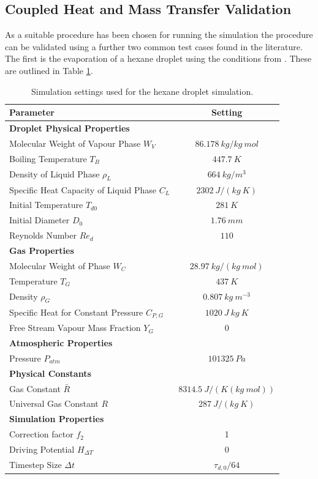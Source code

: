 \documentclass[../Interim_Report_Master]{subfiles}
\begin{document}
\subsection{Coupled Heat and Mass Transfer Validation}\label{sec:heat_mass_val}
As a suitable procedure has been chosen for running the simulation the procedure can be validated using a further two common test cases found in the literature. The first is the evaporation of a hexane droplet using the conditions from \cite{Downing1966}. These are outlined in Table \ref{tab:sim_set_hex}. 
\begin{table}[H]
	\centering
	\begin{tabular}{|l c|}
		\hline
		\textbf{Parameter} & \textbf{Setting} \\ \hline
		\textbf{Droplet Physical Properties} &  \\ 
		Molecular Weight of Vapour Phase $W_V$ & $86.178~kg/kg~mol$ \\ 
		Boiling Temperature $T_B$ & $447.7~K$ \\ 
		Density of Liquid Phase $\rho_L$ & $664~kg/m^3$ \\
		Specific Heat Capacity of Liquid Phase $C_L$ & $2302~J/(kg~K)$ \\ 
		Initial Temperature $T_{d0}$ & $281~K$ \\ 
		Initial Diameter $D_0$ & $1.76~mm$ \\ 
		Reynolds Number $Re_d$ & $110$ \\ \hline
		\textbf{Gas Properties} &  \\ 
		Molecular Weight of Phase $W_C$ & $28.97~kg/(kg~mol)$ \\ 
		Temperature $T_G$ & $437~K$ \\
		Density $\rho_G$ & $0.807~kg~m^{-3}$ \\ 
		Specific Heat for Constant Pressure $C_{P,G}$ & $1020~J~kg~K$ \\
		Free Stream Vapour Mass Fraction $Y_G$ & $0$ \\ \hline
		\textbf{Atmospheric Properties} &  \\ 
		Pressure $P_{atm}$ & $101325~Pa$ \\ \hline
		\textbf{Physical Constants} &  \\ 
		Gas Constant $\bar{R}$ & $8314.5~J/(K(kg~mol))$ \\ 
		Universal Gas Constant $R$ & $287~J/(kg~K)$ \\ \hline
		\textbf{Simulation Properties} &  \\ 
		Correction factor $f_2$ & 1 \\
		Driving Potential $H_{\Delta T}$ & 0 \\
		Timestep Size $\Delta t$ & $\tau_{d,0}/64$ \\ \hline
	\end{tabular}
	\caption{Simulation settings used for the hexane droplet simulation.}
	\label{tab:sim_set_hex}
\end{table}
\end{document}
